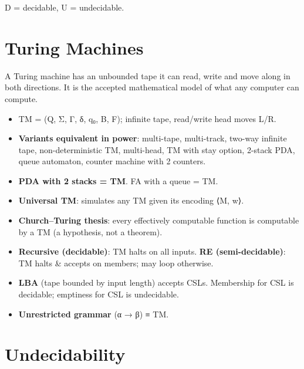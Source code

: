 \endgroup

D = decidable, U = undecidable.

\needspace{125pt}

\hypertarget{p2-08--7-turing-machines}{%
\section{Turing Machines}\label{p2-08--7-turing-machines}}

A Turing machine has an unbounded tape it can read, write and move along in both directions. It is the
accepted mathematical model of what any computer can compute.

\begin{itemize}
\tightlist
\item
  TM = (Q, Σ, Γ, δ, q₀, B, F); infinite tape, read/write head moves L/R.
\item
  \textbf{Variants equivalent in power}: multi-tape, multi-track, two-way infinite tape, non-deterministic TM, multi-head, TM with stay option, 2-stack PDA, queue automaton, counter machine with 2 counters.
\item
  \textbf{PDA with 2 stacks = TM}. FA with a queue = TM.
\item
  \textbf{Universal TM}: simulates any TM given its encoding ⟨M, w⟩.
\item
  \textbf{Church--Turing thesis}: every effectively computable function is computable by a TM (a hypothesis, not a theorem).
\item
  \textbf{Recursive (decidable)}: TM halts on all inputs. \textbf{RE (semi-decidable)}: TM halts \& accepts on members; may loop otherwise.
\item
  \textbf{LBA} (tape bounded by input length) accepts CSLs. Membership for CSL is decidable; emptiness for CSL is undecidable.
\item
  \textbf{Unrestricted grammar} (α → β) ≡ TM.
\end{itemize}



\needspace{95pt}

\hypertarget{p2-08--8-undecidability}{%
\section{Undecidability}\label{p2-08--8-undecidability}}



